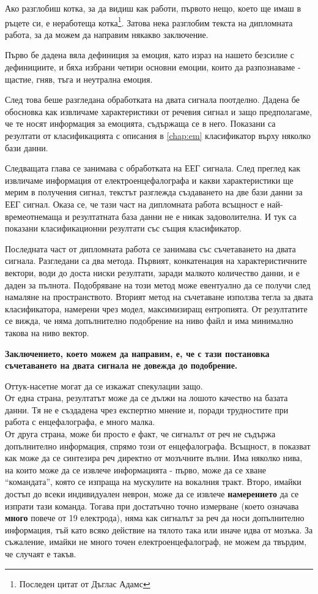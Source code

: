 \documentclass[main.tex]{subfiles}
\begin{document}
Ако разглобиш котка, за да видиш как работи, първото нещо, което ще имаш в ръцете си, е неработеща котка\footnote{Последен цитат от Дъглас Адамс}. Затова нека разглобим текста на дипломната работа, за да можем да направим някакво заключение.

Първо бе дадена вяла дефиниция за емоция, като израз на нашето безсилие с дефинициите, и бяха избрани четири основни емоции, които да разпознаваме - щастие, гняв, тъга и неутрална емоция.

След това беше разгледана обработката на двата сигнала поотделно. Дадена бе обосновка как извличаме характеристики от речевия сигнал и защо предполагаме, че те носят информация за емоцията, съдържаща се в него. Показани са резултати от класификацията с описания в \autoref{chap:em} класификатор върху няколко бази данни.

Следващата глава се занимава с обработката на ЕЕГ сигнала. След преглед как извличаме информация от електроенцефалографа и какви характеристики ще мерим в получения сигнал, текстът разглежда създаването на две бази данни за ЕЕГ сигнал. Оказа се, че тази част на дипломната работа всъщност е най-времеотнемаща и резултатната база данни не е никак задоволителна. И тук са показани класификационни резултати със същия класификатор.

Последната част от дипломната работа се занимава със съчетаването на двата сигнала. Разгледани са два метода. Първият, конкатенация на характеристичните вектори, води до доста ниски резултати, заради малкото количество данни, и е даден за пълнота. Подобряване на този метод може евентуално да се получи след намаляне на пространството. Вторият метод на съчетаване използва тегла за двата класификатора, намерени чрез модел, максимизиращ ентропията. От резултатите се вижда, че няма допълнително подобрение на ниво файл и има минимално такова на ниво вектор. 

\textbf{Заключението, което можем да направим, е, че с тази постановка съчетаването на двата сигнала не довежда до подобрение.}

Оттук-насетне могат да се изкажат спекулации защо.\\
От една страна, резултатът може да се дължи на лошото качество на базата данни. Тя не е създадена чрез експертно мнение и, поради трудностите при работа с енцефалографа, е много малка.\\
От друга страна, може би просто е факт, че сигналът от реч не съдържа допълнително информация, спрямо този от енцефалографа. Всъщност, в \cite{synt} показват как може да се синтезира реч директно от мозъчните вълни. Има няколко нива, на които може да се извлече информацията - първо, може да се хване ``командата'', която се изпраща на мускулите на вокалния тракт. Второ, имайки достъп до всеки индивидуален неврон, може да се извлече \textbf{намерението} да се изпрати тази команда. Тогава при достатъчно точно измерване (което означава \textbf{много} повече от 19 електрода), няма как сигналът за реч да носи допълнително информация, тъй като всяко действие на тялото така или иначе идва от мозъка. За съжаление, имайки не много точен електроенцефалограф, не можем да твърдим, че случаят е такъв.
\end{document}
